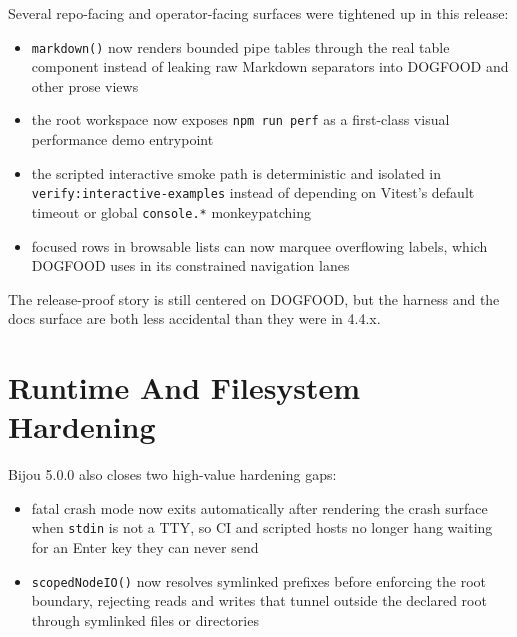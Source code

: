 Several repo-facing and operator-facing surfaces were tightened up in this release:

\begin{itemize}
\tightlist
\item
  \texttt{m\allowbreak{}a\allowbreak{}r\allowbreak{}k\allowbreak{}d\allowbreak{}o\allowbreak{}w\allowbreak{}n\allowbreak{}(\allowbreak{})} now renders bounded pipe tables through the real table component instead of leaking raw Markdown separators into DOGFOOD and other prose views
\item
  the root workspace now exposes \texttt{n\allowbreak{}p\allowbreak{}m\allowbreak{} \allowbreak{}r\allowbreak{}u\allowbreak{}n\allowbreak{} \allowbreak{}p\allowbreak{}e\allowbreak{}r\allowbreak{}f} as a first-class visual performance demo entrypoint
\item
  the scripted interactive smoke path is deterministic and isolated in \texttt{v\allowbreak{}e\allowbreak{}r\allowbreak{}i\allowbreak{}f\allowbreak{}y\allowbreak{}:\allowbreak{}i\allowbreak{}n\allowbreak{}t\allowbreak{}e\allowbreak{}r\allowbreak{}a\allowbreak{}c\allowbreak{}t\allowbreak{}i\allowbreak{}v\allowbreak{}e\allowbreak{}-\allowbreak{}e\allowbreak{}x\allowbreak{}a\allowbreak{}m\allowbreak{}p\allowbreak{}l\allowbreak{}e\allowbreak{}s} instead of depending on Vitest's default timeout or global \texttt{c\allowbreak{}o\allowbreak{}n\allowbreak{}s\allowbreak{}o\allowbreak{}l\allowbreak{}e\allowbreak{}.\allowbreak{}*} monkeypatching
\item
  focused rows in browsable lists can now marquee overflowing labels, which DOGFOOD uses in its constrained navigation lanes
\end{itemize}

The release-proof story is still centered on DOGFOOD, but the harness and the docs surface are both less accidental than they were in 4.4.x.

\section{Runtime And Filesystem Hardening}\label{record-280-runtime-and-filesystem-hardening}

Bijou 5.0.0 also closes two high-value hardening gaps:

\begin{itemize}
\tightlist
\item
  fatal crash mode now exits automatically after rendering the crash surface when \texttt{s\allowbreak{}t\allowbreak{}d\allowbreak{}i\allowbreak{}n} is not a TTY, so CI and scripted hosts no longer hang waiting for an Enter key they can never send
\item
  \texttt{s\allowbreak{}c\allowbreak{}o\allowbreak{}p\allowbreak{}e\allowbreak{}d\allowbreak{}N\allowbreak{}o\allowbreak{}d\allowbreak{}e\allowbreak{}I\allowbreak{}O\allowbreak{}(\allowbreak{})} now resolves symlinked prefixes before enforcing the root boundary, rejecting reads and writes that tunnel outside the declared root through symlinked files or directories
\end{itemize}

